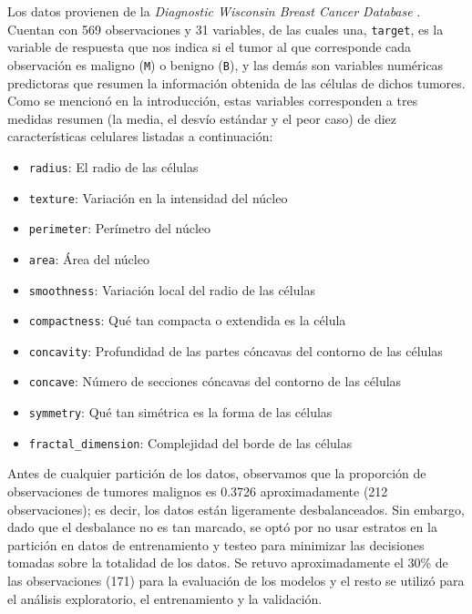 
Los datos provienen de la \textit{Diagnostic Wisconsin Breast Cancer Database}
\parencite{williamwolberg_1993_breast}. Cuentan con 569 observaciones y 31
variables, de las cuales una, \verb|target|, es la variable de respuesta que
nos indica si el tumor al que corresponde cada observación es maligno
(\verb|M|) o benigno (\verb|B|), y las demás son variables numéricas
predictoras que resumen la información obtenida de las células de dichos
tumores. Como se mencionó en la introducción, estas variables corresponden a
tres medidas resumen (la media, el desvío estándar y el peor caso) de diez
características celulares listadas a continuación:

\begin{itemize}
  \item \verb|radius|: El radio de las células
  \item \verb|texture|: Variación en la intensidad del núcleo
  \item \verb|perimeter|: Perímetro del núcleo
  \item \verb|area|: Área del núcleo
  \item \verb|smoothness|: Variación local del radio de las células
  \item \verb|compactness|: Qué tan compacta o extendida es la célula
  \item \verb|concavity|: Profundidad de las partes cóncavas del contorno de las células
  \item \verb|concave|: Número de secciones cóncavas del contorno de las células
  \item \verb|symmetry|: Qué tan simétrica es la forma de las células
  \item \verb|fractal_dimension|: Complejidad del borde de las células
\end{itemize}

Antes de cualquier partición de los datos, observamos que la proporción de
observaciones de tumores malignos es 0.3726 aproximadamente (212
observaciones); es decir, los datos están ligeramente desbalanceados. Sin
embargo, dado que el desbalance no es tan marcado, se optó por no usar estratos
en la partición en datos de entrenamiento y testeo para minimizar las
decisiones tomadas sobre la totalidad de los datos. Se retuvo aproximadamente
el 30\% de las observaciones (171) para la evaluación de los modelos y el resto
se utilizó para el análisis exploratorio, el entrenamiento y la validación.


